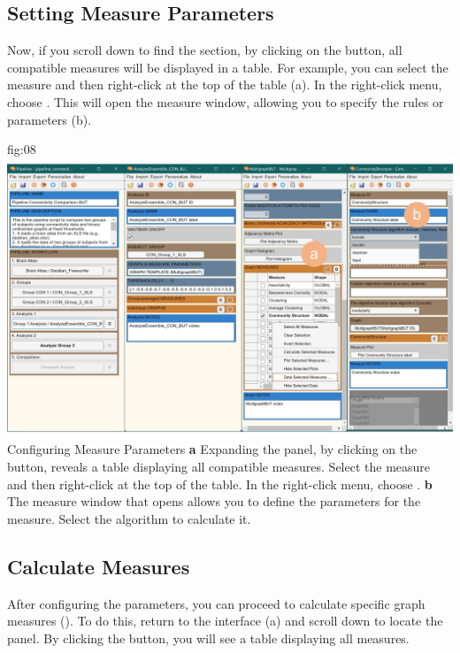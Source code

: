 \documentclass[justified]{tufte-handout}
\begin{document}
\subsection{Setting Measure Parameters}

Now, if you scroll down to find the  section, by clicking on the  button, all compatible measures will be displayed in a table. 
For example, you can select the  measure and then right-click at the top of the table (a). 
In the right-click menu, choose . 
This will open the measure window, allowing you to specify the rules or parameters (b).

{fig:08}
{
	\includegraphics{fig08.jpg}
}
{Configuring Measure Parameters}
{
	{\bf a} Expanding the  panel, by clicking on the  button, reveals a table displaying all compatible measures. 
	Select the  measure and then right-click at the top of the table. In the right-click menu, choose .
	{\bf b} The measure window that opens allows you to define the parameters for the  measure. Select the  algorithm to calculate it.
}


\clearpage
\subsection{Calculate Measures}
 
After configuring the parameters, you can proceed to calculate specific graph measures (). To do this, return to the  interface (a) and scroll down to locate the  panel. By clicking the  button, you will see a table displaying all measures.
\end{document}
